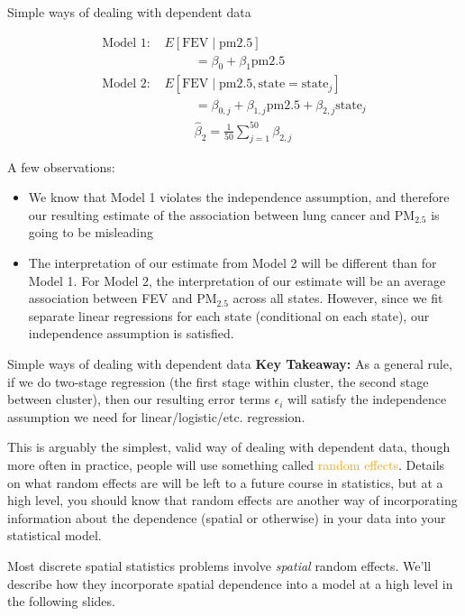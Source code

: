\documentclass[10pt,t]{beamer}
\begin{document}
\begin{frame}{Simple ways of dealing with dependent data}

\vspace{-1cm}

\begin{align*}
\text{Model 1: } & E[\text{FEV} \mid \text{pm2.5}] \\
& \hspace{1cm} = \beta_0 + \beta_1  \text{pm2.5} \\
\text{Model 2: } & E[\text{FEV} \mid \text{pm2.5}, \text{state} = \text{state}_j] \\
& \hspace{1cm} = \beta_{0,j} + \beta_{1,j}  \text{pm2.5} + \beta_{2,j} \text{state}_j \\
& \hspace{1cm} \hat{\beta}_2 = \frac{1}{50} \sum_{j = 1}^{50} \beta_{2,j}
\end{align*}

A few observations:

\begin{itemize}
	\item We know that Model 1 violates the independence assumption, and therefore our resulting estimate of the association between lung cancer and $\text{PM}_{2.5}$ is going to be misleading
	\item The interpretation of our estimate from Model 2 will be different than for Model 1. For Model 2, the interpretation of our estimate will be an average association between FEV and $\text{PM}_{2.5}$ across all states. However, since we fit separate linear regressions for each state (conditional on each state), our independence assumption is satisfied. 
\end{itemize}
\end{frame}

\begin{frame}{Simple ways of dealing with dependent data}
\textbf{Key Takeaway:} As a general rule, if we do two-stage regression (the first stage within cluster, the second stage between cluster), then our resulting error terms $\epsilon_i$ will satisfy the independence assumption we need for linear/logistic/etc. regression.

\vspace{0.3cm}

This is arguably the simplest, valid way of dealing with dependent data, though more often in practice, people will use something called \textcolor{orange}{random effects}. Details on what random effects are will be left to a future course in statistics, but at a high level, you should know that random effects are another way of incorporating information about the dependence (spatial or otherwise) in your data into your statistical model.

\vspace{0.3cm}

Most discrete spatial statistics problems involve \textit{spatial} random effects. We'll describe how they incorporate spatial dependence into a model at a high level in the following slides.
\end{frame}
\end{document}

